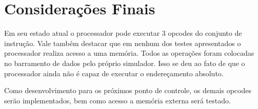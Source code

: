 \documentclass[
	12pt,				  %
	openright,		%
	a4paper,			%
	english,			%
	french,				%
	spanish,			%
	brazil,				%
]{abntex2}
\begin{document}
\chapter{Considerações Finais}

Em seu estado atual o processador pode executar 3 opcodes do conjunto de instrução.
Vale também destacar que em nenhum dos testes apresentados o processador realiza acesso a uma memória.
Todos as operações foram colocadas no barramento de dados pelo próprio simulador.
Isso se deu ao fato de que o processador ainda não é capaz de executar o endereçamento absoluto.

Como desenvolvimento para os próximos ponto de controle, os demais opcodes serão implementados,
bem como acesso a memória externa será testado.



\postextual




\end{document}
